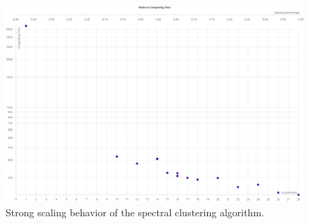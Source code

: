 \begin{figure}
  \includegraphics[width=0.9\linewidth]{images/strong_scaling_chart.png}
  \caption{Strong scaling behavior of the spectral clustering algorithm.}\label{fig:strong_scaling}
\end{figure}
